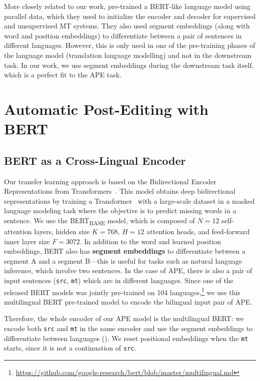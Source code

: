 More closely related to our work, \citet{lample2019xlm}
pre-trained a BERT-like language model using parallel data, which
they used to initialize the encoder and decoder for supervised and
unsupervised MT systems. They also used segment embeddings (along
with word and position embeddings) to differentiate between a pair of
sentences in different languages. However, this is only used in one
of the pre-training phases of the language model (translation
language modelling) and not in the downstream task. In our work, we
use segment embeddings during the downstream task itself, which is a
perfect fit to the APE task.

\section{Automatic Post-Editing with BERT}\label{sec:ape_bert}

\subsection{BERT as a Cross-Lingual Encoder}

Our transfer learning approach is based on the Bidirectional Encoder
Representations from Transformers~\citep[BERT;][]{devlin2018bert}.
This model obtains deep bidirectional representations by training a
Transformer~\citep{vaswani2017attention} with a large-scale dataset
in a masked language modeling task where the objective is to predict
missing words in a sentence. We use the BERT\textsubscript{\textsc{BASE}}
model, which is composed of $N\!\!=\!\!12$ self-attention layers, hidden size
$K\!\!=\!\!768$, $H\!\!=\!\!12$ attention heads, and feed-forward inner layer size
$F\!\!=\!\!3072$. In addition to the word and learned position embeddings,
BERT also has {\bf segment embeddings} to differentiate between a
segment A and a segment B---this is useful for tasks such as natural
language inference, which involve two sentences. In the case of APE,
there is also a pair of input sentences ({\tt src}, {\tt mt}) which
are in different languages. Since one of the released BERT models was
jointly pre-trained on 104 languages,\footnote{
    \url{https://github.com/google-research/bert/blob/master/multilingual.md}}
we use this multilingual BERT pre-trained model to encode the
bilingual input pair of APE.

Therefore, the whole encoder of our APE model is the multilingual
BERT: we encode both {\tt src} and {\tt mt} in the same encoder and
use the segment embeddings to differentiate between languages
(). We reset positional
embeddings when the {\tt mt} starts, since it is not a continuation
of {\tt src}.

